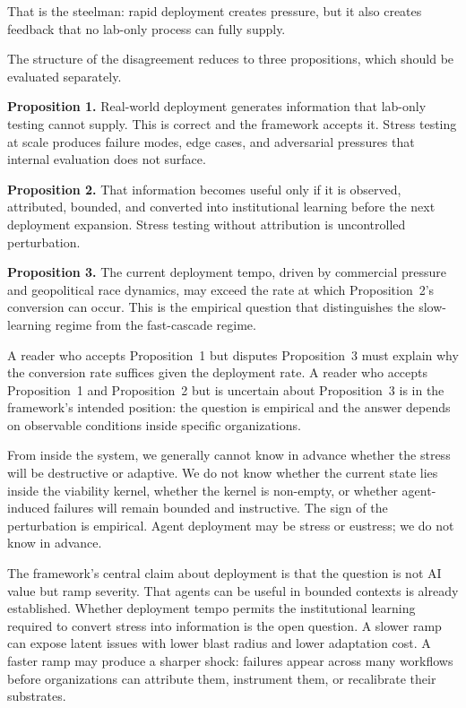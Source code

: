 \documentclass[11pt]{article}
\begin{document}
That is the steelman: rapid deployment creates pressure, but it also creates feedback that no lab-only process can fully supply.

The structure of the disagreement reduces to three propositions, which should be evaluated separately.

\textbf{Proposition 1.} Real-world deployment generates information that lab-only testing cannot supply. This is correct and the framework accepts it. Stress testing at scale produces failure modes, edge cases, and adversarial pressures that internal evaluation does not surface.

\textbf{Proposition 2.} That information becomes useful only if it is observed, attributed, bounded, and converted into institutional learning before the next deployment expansion. Stress testing without attribution is uncontrolled perturbation.

\textbf{Proposition 3.} The current deployment tempo, driven by commercial pressure and geopolitical race dynamics, may exceed the rate at which Proposition~2's conversion can occur. This is the empirical question that distinguishes the slow-learning regime from the fast-cascade regime.

A reader who accepts Proposition~1 but disputes Proposition~3 must explain why the conversion rate suffices given the deployment rate. A reader who accepts Proposition~1 and Proposition~2 but is uncertain about Proposition~3 is in the framework's intended position: the question is empirical and the answer depends on observable conditions inside specific organizations.

From inside the system, we generally cannot know in advance whether the stress will be destructive or adaptive. We do not know whether the current state lies inside the viability kernel, whether the kernel is non-empty, or whether agent-induced failures will remain bounded and instructive. The sign of the perturbation is empirical. Agent deployment may be stress or eustress; we do not know in advance.

The framework's central claim about deployment is that the question is not AI value but ramp severity. That agents can be useful in bounded contexts is already established. Whether deployment tempo permits the institutional learning required to convert stress into information is the open question. A slower ramp can expose latent issues with lower blast radius and lower adaptation cost. A faster ramp may produce a sharper shock: failures appear across many workflows before organizations can attribute them, instrument them, or recalibrate their substrates.
\end{document}
